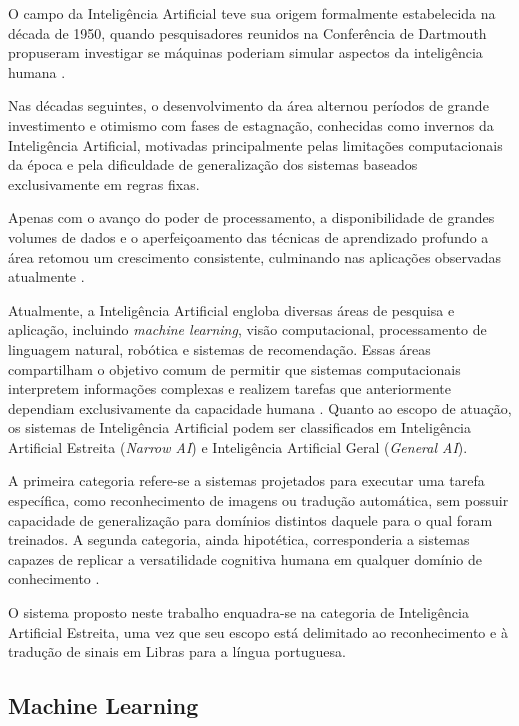 \documentclass[
    12pt,                %
    openright,           %
    oneside,             %
    a4paper,             %
    english,             %
    brazil               %
]{abntex2}
\begin{document}
O campo da Inteligência Artificial teve sua origem formalmente estabelecida na década de 1950, quando pesquisadores reunidos na Conferência de Dartmouth propuseram investigar se máquinas poderiam simular aspectos da inteligência humana \cite{russell2021}. 

Nas décadas seguintes, o desenvolvimento da área alternou períodos de grande investimento e otimismo com fases de estagnação, conhecidas como invernos da Inteligência Artificial, motivadas principalmente pelas limitações computacionais da época e pela dificuldade de generalização dos sistemas baseados exclusivamente em regras fixas. 

Apenas com o avanço do poder de processamento, a disponibilidade de grandes volumes de dados e o aperfeiçoamento das técnicas de aprendizado profundo a área retomou um crescimento consistente, culminando nas aplicações observadas atualmente \cite{russell2021}.

Atualmente, a Inteligência Artificial engloba diversas áreas de pesquisa e aplicação, incluindo \textit{machine learning}, visão computacional, processamento de linguagem natural, robótica e sistemas de recomendação. Essas áreas compartilham o objetivo comum de permitir que sistemas computacionais interpretem informações complexas e realizem tarefas que anteriormente dependiam exclusivamente da capacidade humana \cite{russell2021}.
Quanto ao escopo de atuação, os sistemas de Inteligência Artificial podem ser classificados em Inteligência Artificial Estreita (\textit{Narrow AI}) e Inteligência Artificial Geral (\textit{General AI}). 

A primeira categoria refere-se a sistemas projetados para executar uma tarefa específica, como reconhecimento de imagens ou tradução automática, sem possuir capacidade de generalização para domínios distintos daquele para o qual foram treinados. A segunda categoria, ainda hipotética, corresponderia a sistemas capazes de replicar a versatilidade cognitiva humana em qualquer domínio de conhecimento \cite{russell2021}. 

O sistema proposto neste trabalho enquadra-se na categoria de Inteligência Artificial Estreita, uma vez que seu escopo está delimitado ao reconhecimento e à tradução de sinais em Libras para a língua portuguesa.

\subsection{Machine Learning}
\end{document}

